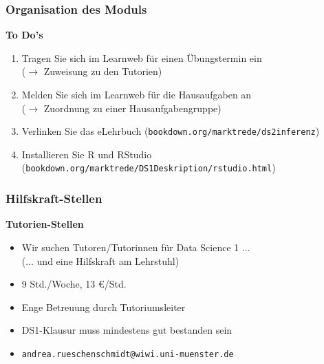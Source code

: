 \documentclass[12pt,show notes]{beamer}
\begin{document}
\begin{frame}
\frametitle{Organisation des Moduls}
\textbf{To Do's}\medskip
\begin{enumerate}
\item Tragen Sie sich im Learnweb für einen Übungstermin ein\\
($\longrightarrow$ Zuweisung zu den Tutorien)
\item Melden Sie sich im Learnweb für die Hausaufgaben an\\
($\longrightarrow$ Zuordnung zu einer Hausaufgabengruppe)
\item Verlinken Sie das eLehrbuch 
{\footnotesize (\texttt{bookdown.org/marktrede/ds2inferenz})}
\item Installieren Sie R und RStudio
{\footnotesize (\texttt{bookdown.org/marktrede/DS1Deskription/rstudio.html})}
\end{enumerate}
\end{frame}

\begin{frame}
\frametitle{Hilfskraft-Stellen}
\textbf{Tutorien-Stellen}\medskip
\begin{itemize}
\item Wir suchen Tutoren/Tutorinnen für Data Science 1 ...\\
(... und eine Hilfskraft am Lehrstuhl)
\item 9 Std./Woche, 13 \euro/Std.
\item Enge Betreuung durch Tutoriumsleiter
\item DS1-Klausur muss mindestens gut bestanden sein
\item \texttt{andrea.rueschenschmidt@wiwi.uni-muenster.de}
\end{itemize}
\end{frame}
\end{document}
